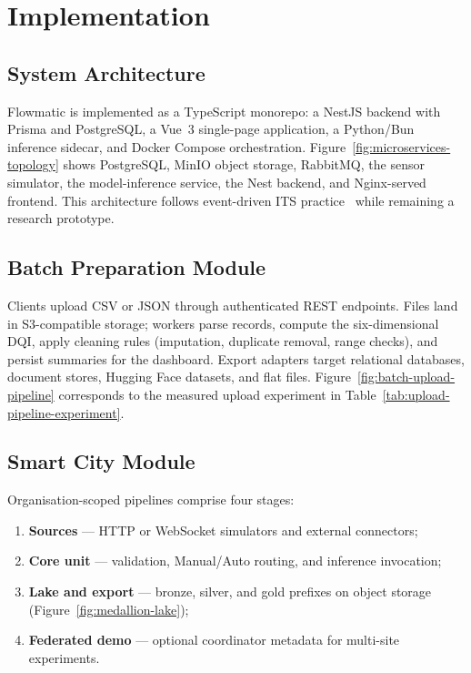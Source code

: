 %
%
\chapter{Implementation}
\label{chap:implementation}
\setlength{\parskip}{0.7em}

\section{System Architecture}

Flowmatic is implemented as a TypeScript monorepo: a NestJS backend with Prisma and PostgreSQL, a Vue~3 single-page application, a Python/Bun inference sidecar, and Docker Compose orchestration. Figure~\ref{fig:microservices-topology} shows PostgreSQL, MinIO object storage, RabbitMQ, the sensor simulator, the model-inference service, the Nest backend, and Nginx-served frontend. This architecture follows event-driven ITS practice~\cite{event_driven2025,kreps2011kafka} while remaining a research prototype.

\section{Batch Preparation Module}

Clients upload CSV or JSON through authenticated REST endpoints. Files land in S3-compatible storage; workers parse records, compute the six-dimensional DQI, apply cleaning rules (imputation, duplicate removal, range checks), and persist summaries for the dashboard. Export adapters target relational databases, document stores, Hugging Face datasets, and flat files. Figure~\ref{fig:batch-upload-pipeline} corresponds to the measured upload experiment in Table~\ref{tab:upload-pipeline-experiment}.

\section{Smart City Module}

Organisation-scoped pipelines comprise four stages:
\begin{enumerate}
  \item \textbf{Sources} --- HTTP or WebSocket simulators and external connectors;
  \item \textbf{Core unit} --- validation, Manual/Auto routing, and inference invocation;
  \item \textbf{Lake and export} --- bronze, silver, and gold prefixes on object storage (Figure~\ref{fig:medallion-lake});
  \item \textbf{Federated demo} --- optional coordinator metadata for multi-site experiments.
\end{enumerate}

